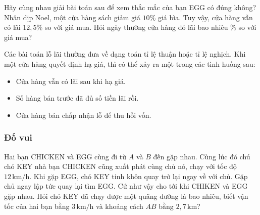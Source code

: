 \begin{bt}%
Hãy cùng nhau giải bài toán sau để xem thắc mắc của bạn EGG có đúng không?\\
Nhân dịp Noel, một cửa hàng sách giảm giá $10\%$ giá bìa. Tuy vậy, cửa hàng vẫn có lãi $12{,}5\%$ so với giá mua. Hỏi ngày thường cửa hàng đó lãi bao nhiêu $\%$ so với giá mua?
\end{bt}
\begin{note} 
Các bài toán lỗ lãi thường đưa về dạng toán tỉ lệ thuận hoặc tỉ lệ nghịch. Khi một cửa hàng quyết định hạ giá, thì có thể xảy ra một trong các tình huống sau:
	\begin{itemize}
		\item Cửa hàng vẫn có lãi sau khi hạ giá.
		\item Số hàng bán trước đã đủ số tiền lãi rồi.
		\item Cửa hàng bán chấp nhận lỗ để thu hồi vốn.
	\end{itemize}
\end{note}
\subsubsection{Đố vui}
Hai bạn CHICKEN và EGG cùng đi từ $A$ và $B$ đến gặp nhau. Cùng lúc đó chú chó KEY nhà bạn CHICKEN cũng xuất phát cùng chủ nó, chạy với tốc độ $12\, \mathrm{km}/\mathrm{h}$. Khi gặp EGG, chó KEY tinh khôn quay trở lại ngay về với chủ. Gặp chủ ngay lập tức quay lại tìm EGG. Cứ như vậy cho tới khi CHIKEN và EGG gặp nhau. Hỏi chó KEY đã chạy được một quãng đường là bao nhiêu, biết vận tốc của hai bạn bằng $3\, \mathrm{km}/\mathrm{h}$ và khoảng cách $AB$ bằng $2{,}7\, \mathrm{km}$? 

